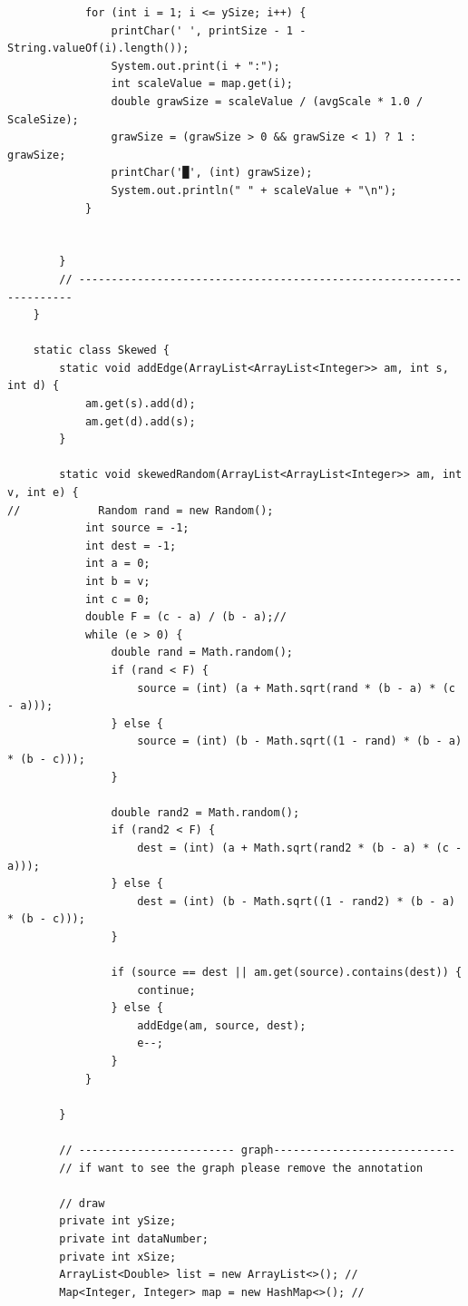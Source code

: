 \documentclass{article}
\begin{document}
\begin{verbatim}
            for (int i = 1; i <= ySize; i++) {
                printChar(' ', printSize - 1 - String.valueOf(i).length());
                System.out.print(i + ":");
                int scaleValue = map.get(i);
                double grawSize = scaleValue / (avgScale * 1.0 / ScaleSize);
                grawSize = (grawSize > 0 && grawSize < 1) ? 1 : grawSize;
                printChar('█', (int) grawSize);
                System.out.println(" " + scaleValue + "\n");
            }


        }
        // ---------------------------------------------------------------------
    }

    static class Skewed {
        static void addEdge(ArrayList<ArrayList<Integer>> am, int s, int d) {
            am.get(s).add(d);
            am.get(d).add(s);
        }

        static void skewedRandom(ArrayList<ArrayList<Integer>> am, int v, int e) {
//            Random rand = new Random();
            int source = -1;
            int dest = -1;
            int a = 0;
            int b = v;
            int c = 0;
            double F = (c - a) / (b - a);//
            while (e > 0) {
                double rand = Math.random();
                if (rand < F) {
                    source = (int) (a + Math.sqrt(rand * (b - a) * (c - a)));
                } else {
                    source = (int) (b - Math.sqrt((1 - rand) * (b - a) * (b - c)));
                }

                double rand2 = Math.random();
                if (rand2 < F) {
                    dest = (int) (a + Math.sqrt(rand2 * (b - a) * (c - a)));
                } else {
                    dest = (int) (b - Math.sqrt((1 - rand2) * (b - a) * (b - c)));
                }

                if (source == dest || am.get(source).contains(dest)) {
                    continue;
                } else {
                    addEdge(am, source, dest);
                    e--;
                }
            }

        }

        // ------------------------ graph----------------------------
        // if want to see the graph please remove the annotation

        // draw
        private int ySize;
        private int dataNumber;
        private int xSize;
        ArrayList<Double> list = new ArrayList<>(); //
        Map<Integer, Integer> map = new HashMap<>(); // 



\end{verbatim}
\end{document}
